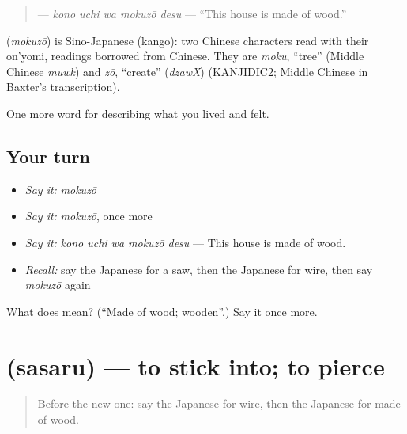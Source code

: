 \begin{quote}
\textbf{  } — \emph{kono uchi wa mokuzō desu} — \textquotedblleft{}This house is made of wood.\textquotedblright{}
\end{quote}

\begin{cousinweb}
\textbf{} (\emph{mokuzō}) is Sino-Japanese (kango): two Chinese characters read with their on'yomi, readings borrowed from Chinese. They are \emph{moku}, \textquotedblleft{}tree\textquotedblright{} (Middle Chinese \emph{muwk}) and \emph{zō}, \textquotedblleft{}create\textquotedblright{} (\emph{dzawX}) (KANJIDIC2; Middle Chinese in Baxter's transcription).
\end{cousinweb}

\begin{grammarlens}[title={What you've built}]
One more word for describing what you lived and felt.
\end{grammarlens}

\subsection*{Your turn}
\begin{itemize}
\raggedright
  \item \emph{Say it:} \emph{mokuzō}
  \item \emph{Say it:} \emph{mokuzō}, once more
  \item \emph{Say it:} \emph{kono uchi wa mokuzō desu} — This house is made of wood.
  \item \emph{Recall:} say the Japanese for a saw, then the Japanese for wire, then say \emph{mokuzō} again
\end{itemize}

\begin{tcolorbox}[breakable,colback=teal!4,colframe=teal!35!black,title={Before you move on}]
What does  mean? (\textquotedblleft{}Made of wood; wooden\textquotedblright{}.) Say it once more.
\end{tcolorbox}
\section[\texorpdfstring{\ja{ささる} (sasaru)}{ささる (sasaru)}]{ (sasaru) — to stick into; to pierce}

\label{lesson:JA-C482-sasaru}



\begin{quote}
Before the new one: say the Japanese for wire, then the Japanese for made of wood.
\end{quote}

